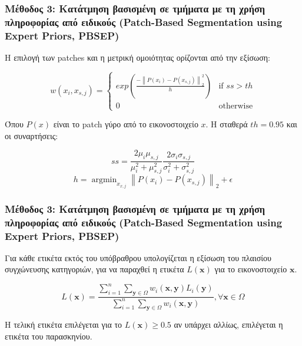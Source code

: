 \documentclass{beamer}
\newcommand{\argminB}{\mathop{\mathrm{argmin}}}
\newcommand\norm[1]{\left\lVert#1\right\rVert}
\begin{document}
\begin{frame}
\frametitle{Μέθοδος 3: Κατάτμηση βασισμένη σε τμήματα με τη χρήση
πληροφορίας από ειδικούς (Patch-Based Segmentation using Expert Priors, PBSEP)}

Η επιλογή των patches και η μετρική ομοιότητας ορίζονται από την εξίσωση:

\begin{equation*}
    w(x_i, x_{s,j}) = 
    \begin{cases}
        exp\left( \frac {- \norm{P(x_i) - P(x_{s,j})}_2^2 } {h} \right)
            & \text{if } ss > th\\
        0   & \text{otherwise}
    \end{cases}
\end{equation*}

Όπου $P(x)$ είναι το patch γύρο από το εικονοστοιχείο $x$. Η σταθερά $th = 0.95$
και οι συναρτήσεις:

\begin{equation*}
    ss = \frac {2 \mu_i \mu_{s,j}} {\mu_i^2 + \mu_{s,j}^2} 
         \frac {2 \sigma_i \sigma_{s,j}} {\sigma_i^2 + \sigma_{s,j}^2}
\end{equation*}
\begin{equation*}
    h = \argminB_{x_{x,j}} \norm{P(x_i) - P(x_{s,j})}_2 + \epsilon
\end{equation*}

\end{frame}


\begin{frame}
\frametitle{Μέθοδος 3: Κατάτμηση βασισμένη σε τμήματα με τη χρήση
πληροφορίας από ειδικούς (Patch-Based Segmentation using Expert Priors, PBSEP)}

Για κάθε ετικέτα εκτός του υπόβραθρου υπολογίζεται η εξίσωση του πλαισίου
συγχώνευσης κατηγοριών, για να παραχθεί η ετικέτα $L(\bm{x})$ για το
εικονοστοιχείο $\bm{x}$.

\begin{equation*}
    L(\bm{x})=\frac{ \sum_{i=1}^{n}  \sum_{\bm{y}\in\Omega}
                     w_i(\bm{x},\bm{y})L_i(\bm{y})}
    { \sum_{i=1}^{n}  \sum_{\bm{y}\in\Omega} w_i(\bm{x},\bm{y}) }
    , \forall \bm{x}\in\Omega
\end{equation*}

Η τελική ετικέτα επιλέγεται για το $L(\bm{x}) \geq 0.5$ αν υπάρχει αλλίως,
επιλέγεται η ετικέτα του παρασκηνίου.

\end{frame}
\end{document}
